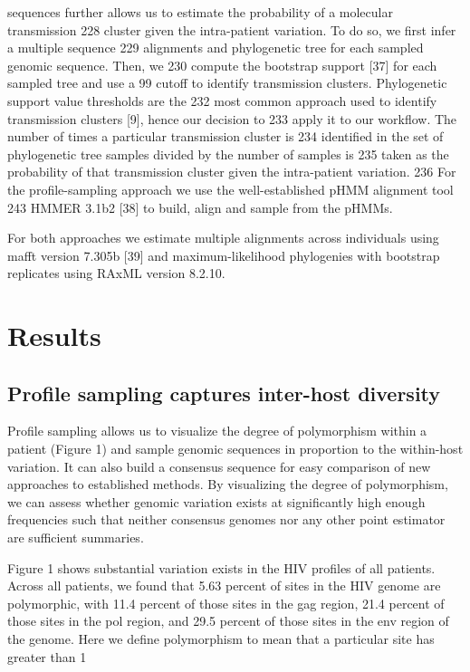 \documentclass[letterpaper]{article}
\begin{document}
sequences further allows us to estimate the probability of a molecular transmission	228
cluster given the intra-patient variation.  To do so, we first infer a multiple sequence	229
alignments and phylogenetic tree for each sampled genomic sequence. Then, we	230
compute the bootstrap support [37] for each sampled tree and use a 99%
cutoff to identify transmission clusters.  Phylogenetic support value thresholds are the	232
most common approach used to identify transmission clusters [9], hence our decision to	233
apply it to our workflow.  The number of times a particular transmission cluster is	234
identified in the set of phylogenetic tree samples divided by the number of samples is	235
taken as the probability of that transmission cluster given the  intra-patient variation.	236
For  the profile-sampling approach we use the well-established pHMM  alignment tool	243
HMMER 3.1b2 [38] to build, align and sample from the pHMMs. 

For both approaches we estimate multiple alignments across individuals using mafft version 7.305b [39] and maximum-likelihood phylogenies with bootstrap replicates using RAxML version 8.2.10.

\section*{Results}

\subsection*{Profile sampling captures inter-host diversity}

Profile sampling allows us to visualize the degree of polymorphism within a patient (Figure 1) and sample genomic sequences in proportion to the within-host variation. It can also build a consensus sequence for easy comparison of new approaches to established methods. By visualizing the degree of polymorphism, we can assess whether genomic variation exists at significantly high enough frequencies such that neither consensus genomes nor any other point estimator are sufficient summaries.

Figure 1 shows substantial variation exists in the HIV profiles of all patients. Across	all patients, we found that 5.63 percent of sites in the HIV genome are polymorphic, with 11.4 percent of those sites in the gag region, 21.4 percent of those sites in the pol region, and 29.5 percent of those sites in the env region of the genome. Here we define polymorphism to mean that a particular site has greater than 1%
\end{document}
